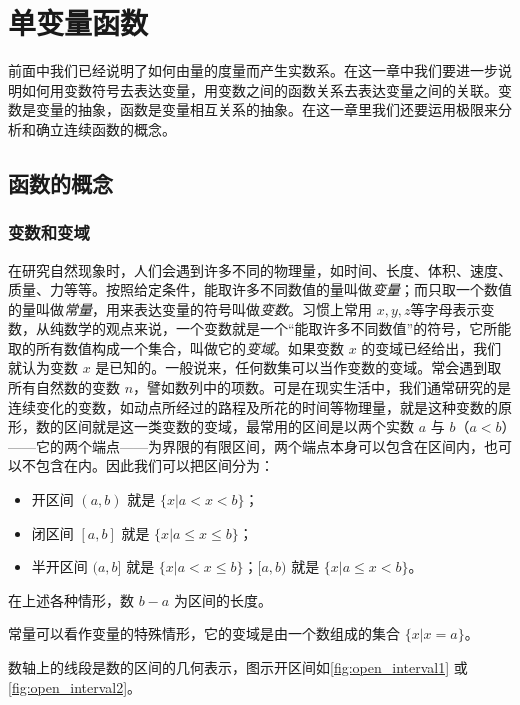 \chapter{单变量函数}
前面中我们已经说明了如何由量的度量而产生实数系。在这一章中我们要进一步说明如何用变数符号去表达变量，用变数之间的函数关系去表达变量之间的关联。变数是变量的抽象，函数是变量相互关系的抽象。在这一章里我们还要运用极限来分析和确立连续函数的概念。

\section{函数的概念}
\subsection{变数和变域}
在研究自然现象时，人们会遇到许多不同的物理量，如时间、长度、体积、速度、质量、力等等。按照给定条件，能取许多不同数值的量叫做\emph{变量}；而只取一个数值的量叫做\emph{常量}，用来表达变量的符号叫做\emph{变数}。习惯上常用 $x,y,z$等字母表示变数，从纯数学的观点来说，一个变数就是一个“能取许多不同数值”的符号，它所能取的所有数值构成一个集合，叫做它的\emph{变域}。如果变数 $x$ 的变域已经给出，我们就认为变数 $x$ 是已知的。一般说来，任何数集可以当作变数的变域。常会遇到取所有自然数的变数 $n$，譬如数列中的项数。可是在现实生活中，我们通常研究的是连续变化的变数，如动点所经过的路程及所花的时间等物理量，就是这种变数的原形，数的区间就是这一类变数的变域，最常用的区间是以两个实数 $a$ 与 $b$（$a<b$）——它的两个端点——为界限的有限区间，两个端点本身可以包含在区间内，也可以不包含在内。因此我们可以把区间分为：
\begin{itemize}
    \item 开区间 $(a,b)$ 就是 $\{x|a<x<b\}$；
    \item 闭区间 $[a,b]$ 就是 $\{x|a\leqslant x\leqslant b\}$；
    \item 半开区间 $(a,b]$ 就是 $\{x|a<x\leqslant b\}$；$[a,b)$ 就是 $\{x|a\leqslant x<b\}$。
\end{itemize}
在上述各种情形，数 $b-a$ 为区间的长度。

常量可以看作变量的特殊情形，它的变域是由一个数组成的集合 $\{x|x=a\}$。

数轴上的线段是数的区间的几何表示，图示开区间如\cref{fig:open_interval1} 或\cref{fig:open_interval2}。

